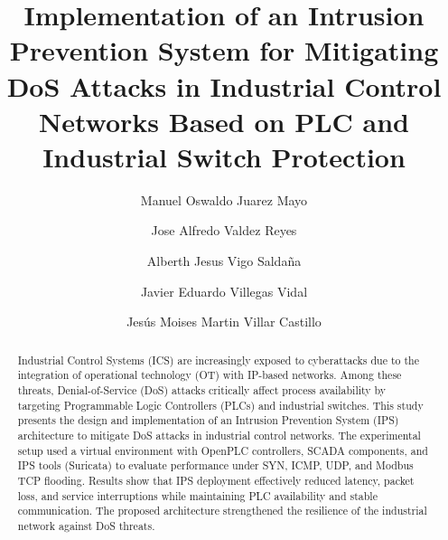 \documentclass[sigconf]{acmart}
\begin{document}
\renewcommand{\abstractname}{Abstract}

\title[IPS for DoS Mitigation in ICS]{Implementation of an Intrusion Prevention System for Mitigating DoS Attacks in Industrial Control Networks Based on PLC and Industrial Switch Protection}


\author[ ]{Manuel Oswaldo Juarez Mayo}

\author[ ]{Jose Alfredo Valdez Reyes}

\author[ ]{Alberth Jesus Vigo Saldaña}

\author[ ]{Javier Eduardo Villegas Vidal}

\author[Juarez Mayo et al.]{Jesús Moises Martin Villar Castillo}

\begin{abstract}
Industrial Control Systems (ICS) are increasingly exposed to cyberattacks due to the integration of operational technology (OT) with IP-based networks. Among these threats, Denial-of-Service (DoS) attacks critically affect process availability by targeting Programmable Logic Controllers (PLCs) and industrial switches. This study presents the design and implementation of an Intrusion Prevention System (IPS) architecture to mitigate DoS attacks in industrial control networks. The experimental setup used a virtual environment with OpenPLC controllers, SCADA components, and IPS tools (Suricata) to evaluate performance under SYN, ICMP, UDP, and Modbus TCP flooding. Results show that IPS deployment effectively reduced latency, packet loss, and service interruptions while maintaining PLC availability and stable communication. The proposed architecture strengthened the resilience of the industrial network against DoS threats.
\end{abstract}
\end{document}
